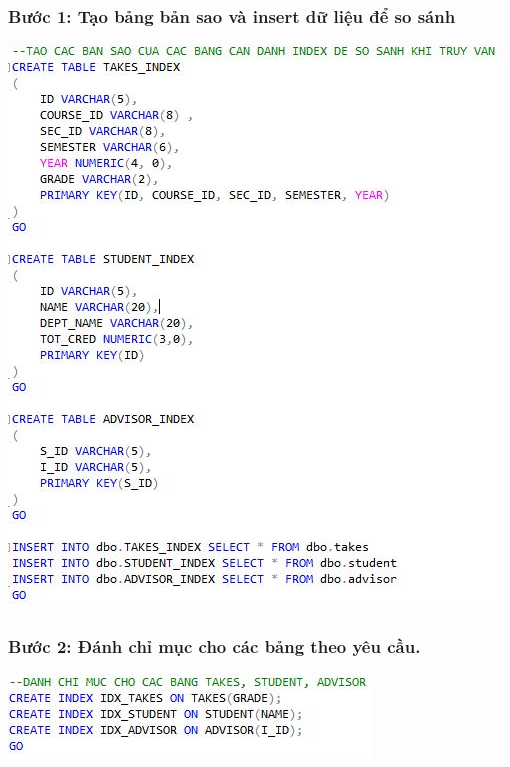 \documentclass[12pt,a4paper]{report}
\begin{document}
\subsubsection{Bước 1: Tạo bảng bản sao và insert dữ liệu để so sánh}
\includegraphics[scale=1]{b8s1}
\subsubsection{Bước 2: Đánh chỉ mục cho các bảng theo yêu cầu.}
\includegraphics[scale=1]{b8s2}
\end{document}
